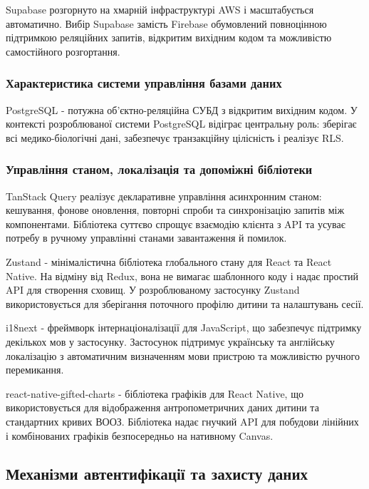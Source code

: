 Supabase розгорнуто на хмарній інфраструктурі AWS і масштабується автоматично. Вибір Supabase замість Firebase обумовлений повноцінною підтримкою реляційних запитів, відкритим вихідним кодом та можливістю самостійного розгортання.

\subsubsection{Характеристика системи управління базами даних}

PostgreSQL - потужна об'єктно-реляційна \gls{СУБД} з відкритим вихідним кодом. У контексті розроблюваної системи PostgreSQL відіграє центральну роль: зберігає всі медико-біологічні дані, забезпечує транзакційну цілісність і реалізує \gls{RLS}.

\subsubsection{Управління станом, локалізація та допоміжні бібліотеки}

TanStack Query реалізує декларативне управління асинхронним станом: кешування, фонове оновлення, повторні спроби та синхронізацію запитів між компонентами. Бібліотека суттєво спрощує взаємодію клієнта з \gls{API} та усуває потребу в ручному управлінні станами завантаження й помилок.

Zustand - мінімалістична бібліотека глобального стану для React та React Native. На відміну від Redux, вона не вимагає шаблонного коду і надає простий \gls{API} для створення сховищ. У розроблюваному застосунку Zustand використовується для зберігання поточного профілю дитини та налаштувань сесії.

i18next - фреймворк інтернаціоналізації для JavaScript, що забезпечує підтримку декількох мов у застосунку. Застосунок підтримує українську та англійську локалізацію з автоматичним визначенням мови пристрою та можливістю ручного перемикання.

react-native-gifted-charts - бібліотека графіків для React Native, що використовується для відображення антропометричних даних дитини та стандартних кривих \gls{ВООЗ}. Бібліотека надає гнучкий \gls{API} для побудови лінійних і комбінованих графіків безпосередньо на нативному Canvas.

\subsection{Механізми автентифікації та захисту даних}

